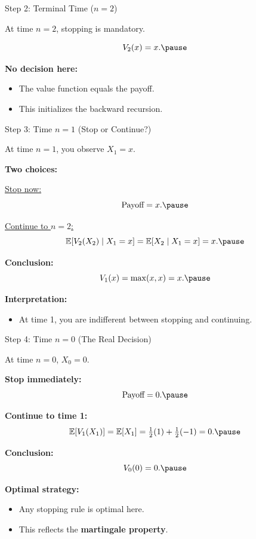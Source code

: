 \documentclass[aspectratio=169]{beamer}
\begin{document}
\begin{frame}{Step 2: Terminal Time ($n=2$)}

At time $n=2$, stopping is mandatory.

\medskip

\[
V_2(x)=x.\pause
\]

\medskip

\textbf{No decision here:}
\begin{itemize}
  \item The value function equals the payoff.\pause
  \item This initializes the backward recursion.
\end{itemize}
\end{frame}

\begin{frame}{Step 3: Time $n=1$ (Stop or Continue?)}

At time $n=1$, you observe $X_1=x$.\pause

\medskip

\textbf{Two choices:}

\medskip
\underline{Stop now:}
\[
\text{Payoff} = x.
\vspace{-3mm}\pause
\]

\underline{Continue to $n=2$:}
\[
\mathbb{E}[V_2(X_2)\mid X_1=x]
=
\mathbb{E}[X_2\mid X_1=x]
=
x.
\vspace{-3mm}\pause
\]

\textbf{Conclusion:}
\[
V_1(x)=\max(x,x)=x.
\vspace{-5mm}\pause
\]

\medskip
\textbf{Interpretation:}
\begin{itemize}
  \item At time 1, you are indifferent between stopping and continuing.\pause
\end{itemize}
\end{frame}

\begin{frame}{Step 4: Time $n=0$ (The Real Decision)}

At time $n=0$, $X_0=0$.

\medskip

\textbf{Stop immediately:}
\[
\text{Payoff}=0.\pause
\]

\medskip
\textbf{Continue to time 1:}
\[
\mathbb{E}[V_1(X_1)]
=
\mathbb{E}[X_1]
=
\tfrac12(1)+\tfrac12(-1)=0.\pause
\]

\medskip

\textbf{Conclusion:}
\[
V_0(0)=0.\pause
\]

\medskip
\textbf{Optimal strategy:}
\begin{itemize}
  \item Any stopping rule is optimal here.\pause
  \item This reflects the \textbf{martingale property}.
\end{itemize}
\end{frame}
\end{document}
